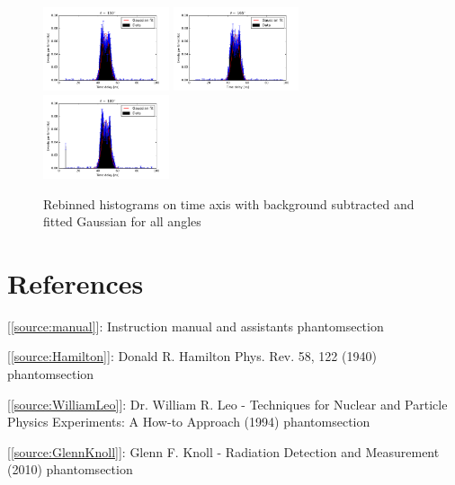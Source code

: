 \documentclass[a4paper,parskip,11pt, DIV12]{scrreprt}
\makeatletter
\newcommand{\labeltext}[2]{%
  \@bsphack
  \csname phantomsection\endcsname %
  \def\@currentlabel{#1}{\label{#2}}%
  \@esphack
}
\makeatother
\begin{document}
\begin{figure}[H]
\includegraphics[width=0.33\textwidth]{150deg.png}\hfill
\includegraphics[width=0.33\textwidth]{165deg.png}\hfill
\includegraphics[width=0.33\textwidth]{180deg.png}
\caption{Rebinned histograms on time axis with background subtracted and fitted Gaussian for all angles}
\end{figure}


\section{References}

[\ref{source:manual}]: Instruction manual and assistants \labeltext{1}{source:manual}

[\ref{source:Hamilton}]: Donald R. Hamilton Phys. Rev. 58, 122 (1940) \labeltext{2}{source:Hamilton}

[\ref{source:WilliamLeo}]: Dr. William R. Leo - Techniques for Nuclear and Particle Physics Experiments: A How-to Approach (1994)\labeltext{3}{source:WilliamLeo}

[\ref{source:GlennKnoll}]: Glenn F. Knoll - Radiation Detection and Measurement (2010) \labeltext{4}{source:GlennKnoll}










\end{document}
